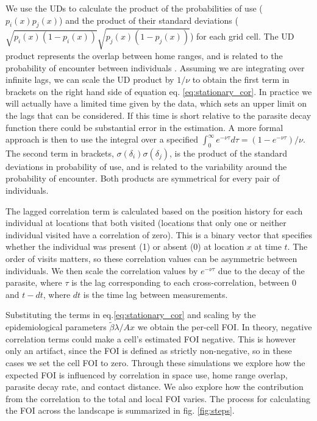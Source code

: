 \documentclass[letterpaper]{article}
\begin{document}
We use the UDs to calculate the product of the probabilities of use ($p_i(x)p_j(x)$) and the product of their standard deviations ($\sqrt{p_i(x)(1-p_i(x))}\sqrt{p_j(x)(1-p_j(x))}$) for each grid cell. 
The UD product represents the overlap between home ranges, and is related to the probability of encounter between individuals \citep{Noonan2021}. Assuming we are integrating over infinite lags, we can scale the UD product by $1/\nu$ to obtain the first term in brackets on the right hand side of equation eq. \ref{eq:stationary_cor}. In practice we will actually have a limited time given by the data, which sets an upper limit on the lags that can be considered. If this time is short relative to the parasite decay function there could be substantial error in the estimation. A more formal approach is then to use the integral over a specified  $\int_0^\infty e^{-\nu\tau}d\tau=(1-e^{-\nu\tau})/\nu$. %
The second term in brackets, $\sigma(\delta_i)\sigma(\delta_j)$, is the product of the standard deviations in probability of use, and is related to the variability around the probability of encounter. 
Both products are symmetrical for every pair of individuals. 

The lagged correlation term is calculated based on the position history for each individual at locations that both visited (locations that only one or neither individual visited have a correlation of zero). This is a binary vector that specifies whether the individual was present (1) or absent (0) at location $x$ at time $t$. 
The order of visits matters, so these correlation values can be asymmetric between individuals. 
We then scale the correlation values by $e^{-\nu\tau}$ due to the decay of the parasite, where $\tau$ is the lag corresponding to each cross-correlation, between 0 and $t-dt$, where $dt$ is the time lag between measurements. 

Substituting the terms in eq.\ref{eq:stationary_cor} and scaling by the epidemiological parameters $\tilde\beta\lambda/ Ax$ we obtain the per-cell FOI. 
In theory, negative correlation terms could make a cell's estimated FOI negative. This is however only an artifact, since the FOI is defined as strictly non-negative, so in these cases we set the cell FOI to zero.
Through these simulations we explore how the expected FOI is influenced by correlation in space use, home range overlap, parasite decay rate, and contact distance. We also explore how the contribution from the correlation to the total and local FOI varies. The process for calculating the FOI across the landscape is summarized in fig. \ref{fig:steps}.
\end{document}
